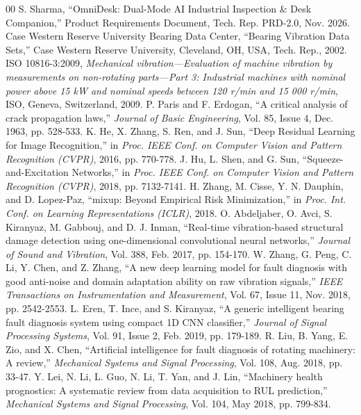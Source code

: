 \documentclass[10pt,journal,onecolumn]{IEEEtran}
\begin{document}
\begin{thebibliography}{00}
 S. Sharma, ``OmniDesk: Dual-Mode AI Industrial Inspection \& Desk Companion,'' Product Requirements Document, Tech. Rep. PRD-2.0, Nov. 2026.
 Case Western Reserve University Bearing Data Center, ``Bearing Vibration Data Sets,'' Case Western Reserve University, Cleveland, OH, USA, Tech. Rep., 2002.
 ISO 10816-3:2009, \textit{Mechanical vibration---Evaluation of machine vibration by measurements on non-rotating parts---Part 3: Industrial machines with nominal power above 15 kW and nominal speeds between 120 r/min and 15 000 r/min}, ISO, Geneva, Switzerland, 2009.
 P. Paris and F. Erdogan, ``A critical analysis of crack propagation laws,'' \textit{Journal of Basic Engineering}, Vol. 85, Issue 4, Dec. 1963, pp. 528-533.
 K. He, X. Zhang, S. Ren, and J. Sun, ``Deep Residual Learning for Image Recognition,'' in \textit{Proc. IEEE Conf. on Computer Vision and Pattern Recognition (CVPR)}, 2016, pp. 770-778.
 J. Hu, L. Shen, and G. Sun, ``Squeeze-and-Excitation Networks,'' in \textit{Proc. IEEE Conf. on Computer Vision and Pattern Recognition (CVPR)}, 2018, pp. 7132-7141.
 H. Zhang, M. Cisse, Y. N. Dauphin, and D. Lopez-Paz, ``mixup: Beyond Empirical Risk Minimization,'' in \textit{Proc. Int. Conf. on Learning Representations (ICLR)}, 2018.
 O. Abdeljaber, O. Avci, S. Kiranyaz, M. Gabbouj, and D. J. Inman, ``Real-time vibration-based structural damage detection using one-dimensional convolutional neural networks,'' \textit{Journal of Sound and Vibration}, Vol. 388, Feb. 2017, pp. 154-170.
 W. Zhang, G. Peng, C. Li, Y. Chen, and Z. Zhang, ``A new deep learning model for fault diagnosis with good anti-noise and domain adaptation ability on raw vibration signals,'' \textit{IEEE Transactions on Instrumentation and Measurement}, Vol. 67, Issue 11, Nov. 2018, pp. 2542-2553.
 L. Eren, T. Ince, and S. Kiranyaz, ``A generic intelligent bearing fault diagnosis system using compact 1D CNN classifier,'' \textit{Journal of Signal Processing Systems}, Vol. 91, Issue 2, Feb. 2019, pp. 179-189.
 R. Liu, B. Yang, E. Zio, and X. Chen, ``Artificial intelligence for fault diagnosis of rotating machinery: A review,'' \textit{Mechanical Systems and Signal Processing}, Vol. 108, Aug. 2018, pp. 33-47.
 Y. Lei, N. Li, L. Guo, N. Li, T. Yan, and J. Lin, ``Machinery health prognostics: A systematic review from data acquisition to RUL prediction,'' \textit{Mechanical Systems and Signal Processing}, Vol. 104, May 2018, pp. 799-834.

\end{thebibliography}
\end{document}
